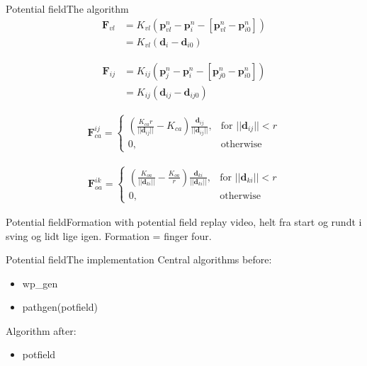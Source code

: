 \documentclass[10pt,handout]{beamer}
\begin{document}
\begin{frame}{Potential field}{The algorithm}
\begin{align}
\mathbf{F}_{vl} &= K_{vl}(\mathbf{p}_{vl}^n-\mathbf{p}_i^n-[\mathbf{p}_{vl}^n-\mathbf{p}_{i0}^n])\\
&= K_{vl}(\mathbf{d}_i-\mathbf{d}_{i0})
\end{align}

\begin{align}
\mathbf{F}_{ij} &= K_{ij}(\mathbf{p}_{j}^n-\mathbf{p}_i^n-[\mathbf{p}_{j0}^n-\mathbf{p}_{i0}^n])\\
&= K_{ij}(\mathbf{d}_{ij}-\mathbf{d}_{ij0})
\end{align}

\begin{align}
    \mathbf{F}_{ca}^{ij}= 
\begin{cases}
    \left(
    \frac{K_{ca}r}{||\mathbf{d}_{ij}||}-K_{ca}
    \right)
    \frac{\mathbf{d}_{ij}}{||\mathbf{d}_{ij}||}
    ,& \text{for } ||\mathbf{d}_{ij}||<r\\
    0,              & \text{otherwise}
\end{cases}
\end{align}

\begin{align}
    \mathbf{F}_{oa}^{ik}= 
\begin{cases}
    \left( \frac{K_{oa}}{||\mathbf{d}_{ki}||}-\frac{K_{oa}}{r}\right)
    \frac{\mathbf{d}_{{ki}}}{||\mathbf{d}_{ki}||},& \text{for } ||\mathbf{d}_{ki}||<r\\
    0,              & \text{otherwise}
\end{cases}
\end{align}
\end{frame}

\begin{frame}{Potential field}{Formation with potential field}
replay video, helt fra start og rundt i sving og lidt lige igen. Formation = finger four.
\end{frame}

\begin{frame}{Potential field}{The implementation}
Central algorithms before:
\begin{itemize}
\item wp\_gen
\item pathgen(potfield)
\end{itemize}
Algorithm after:
\begin{itemize}
\item potfield
\end{itemize}
\end{frame}
\end{document}
